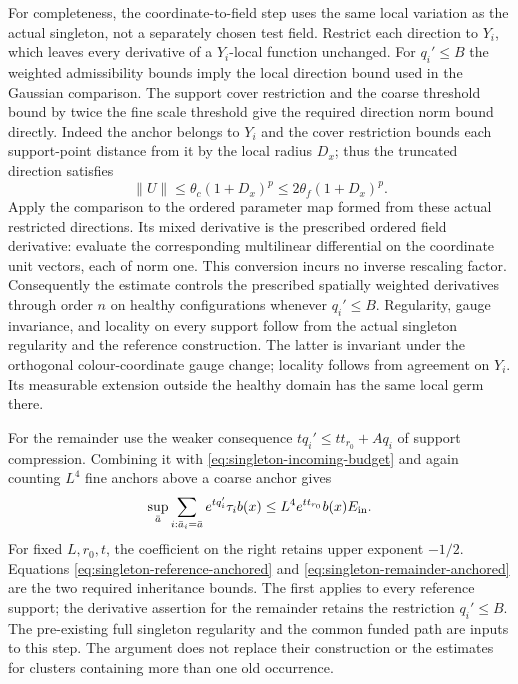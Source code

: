 For completeness, the coordinate-to-field step uses the same local
variation as the actual singleton, not a separately chosen test
field. Restrict each direction to $Y_i$, which leaves every derivative
of a $Y_i$-local function unchanged. For $q_i'\le B$ the weighted
admissibility bounds imply the local direction bound used in the
Gaussian comparison. The support cover restriction and the coarse threshold bound by twice
the fine scale threshold give the required direction norm bound
directly. Indeed the anchor belongs to $Y_i$ and the cover restriction
bounds each support-point distance from it by the local radius $D_x$;
thus the truncated direction satisfies
\[ \|U\|\le\theta_c(1+D_x)^p
                    \le2\theta_f(1+D_x)^p. \]
Apply the comparison to the ordered parameter map formed
from these actual restricted directions. Its mixed derivative is the
prescribed ordered field derivative: evaluate the corresponding
multilinear differential on the coordinate unit vectors, each of norm
one. This conversion incurs no inverse rescaling factor.
Consequently the
estimate controls the prescribed spatially weighted derivatives
through order $n$ on healthy configurations whenever $q_i'\le B$.
Regularity, gauge invariance, and locality on every support follow
from the actual singleton regularity and the reference construction.
The latter is invariant under the orthogonal colour-coordinate gauge
change; locality follows from agreement on $Y_i$. Its measurable
extension outside the healthy domain has the same local germ there.

For the remainder use the weaker consequence
$tq_i'\le t t_{r_0}+Aq_i$ of support compression. Combining it with
\eqref{eq:singleton-incoming-budget} and again counting $L^4$ fine
anchors above a coarse anchor gives
\begin{equation}\label{eq:singleton-remainder-anchored}
 \sup_{\bar a}\sum_{i:\bar a_i=\bar a}
       e^{tq_i'}\tau_i b(x)
       \le L^4 e^{t t_{r_0}}b(x)E_{\rm in}.
\end{equation}
For fixed $L,r_0,t$, the coefficient on the right retains upper
exponent $-1/2$. Equations
\eqref{eq:singleton-reference-anchored} and
\eqref{eq:singleton-remainder-anchored} are the two required
inheritance bounds. The first applies to every reference support;
the derivative assertion for the remainder retains the restriction
$q_i'\le B$. The pre-existing full singleton regularity and the
common funded path are inputs to this step. The argument does not
replace their construction or the estimates for clusters containing
more than one old occurrence.
